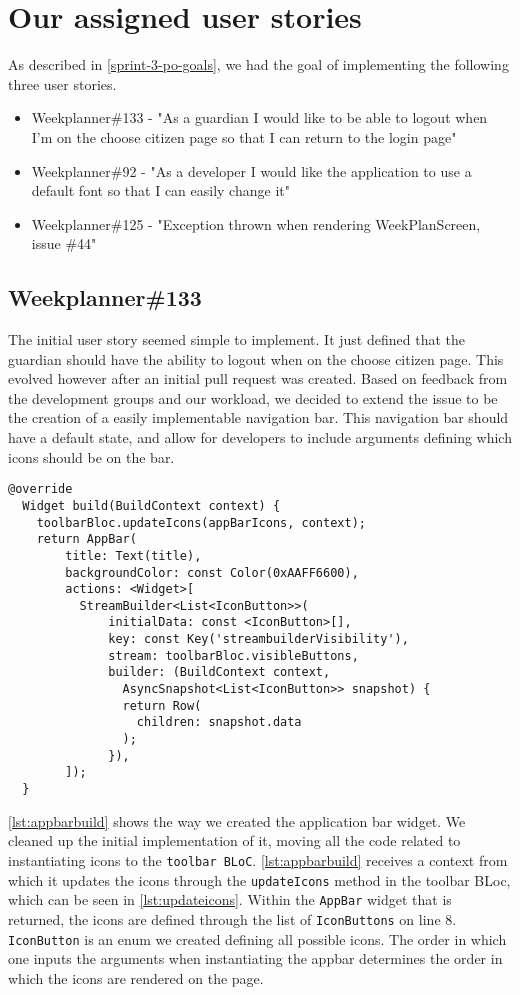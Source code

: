 \section{Our assigned user stories}
As described in \autoref{sprint-3-po-goals}, we had the goal of implementing the following three user stories.
\begin{itemize}\label{item:our-stories-sprint-3}
    \item Weekplanner\#133 - "As a guardian I would like to be able to logout when I'm on the choose citizen page so that I can return to the login page"
    \item Weekplanner\#92 - "As a developer I would like the application to use a default font so that I can easily change it"
    \item Weekplanner\#125 - "Exception thrown when rendering WeekPlanScreen, issue \#44"
\end{itemize}

\subsection{Weekplanner\#133}
The initial user story seemed simple to implement.
It just defined that the guardian should have the ability to logout when on the choose citizen page.
This evolved however after an initial pull request was created.
Based on feedback from the development groups and our workload, we decided to extend the issue to be the creation of a easily implementable navigation bar.
This navigation bar should have a default state, and allow for developers to include arguments defining which icons should be on the bar.

\begin{lstlisting}[caption={Building the appbar},label={lst:appbarbuild},language={[Sharp]C}]
  @override
  Widget build(BuildContext context) {
    toolbarBloc.updateIcons(appBarIcons, context);
    return AppBar(
        title: Text(title),
        backgroundColor: const Color(0xAAFF6600),
        actions: <Widget>[
          StreamBuilder<List<IconButton>>(
              initialData: const <IconButton>[],
              key: const Key('streambuilderVisibility'),
              stream: toolbarBloc.visibleButtons,
              builder: (BuildContext context, 
                AsyncSnapshot<List<IconButton>> snapshot) {
                return Row(
                  children: snapshot.data
                );
              }),
        ]);
  }
\end{lstlisting}
\autoref{lst:appbarbuild} shows the way we created the application bar widget.
We cleaned up the initial implementation of it, moving all the code related to instantiating icons to the \texttt{toolbar BLoC}.
\autoref{lst:appbarbuild} receives a context from which it updates the icons through the \texttt{updateIcons} method in the toolbar BLoc, which can be seen in \autoref{lst:updateicons}.
Within the \texttt{AppBar} widget that is returned, the icons are defined through the list of \texttt{IconButtons} on line 8.
\texttt{IconButton} is an enum we created defining all possible icons.
The order in which one inputs the arguments when instantiating the appbar determines the order in which the icons are rendered on the page. 

